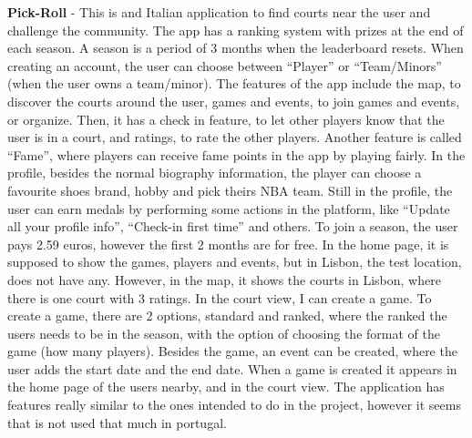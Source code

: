 \textbf{Pick-Roll}\cite{pick-roll} - This is and Italian application to find courts near the user and challenge the community.
The app has a ranking system with prizes at the end of each season.
A season is a period of 3 months when the leaderboard resets.
When creating an account, the user can choose between ``Player'' or ``Team/Minors'' (when the user owns a team/minor).
The features of the app include the map, to discover the courts around the user, games and events, to join games and events, or organize.
Then, it has a check in feature, to let other players know that the user is in a court, and ratings, to rate the other players.
Another feature is called ``Fame'', where players can receive fame points in the app by playing fairly.
In the profile, besides the normal biography information, the player can choose a favourite shoes brand, hobby and pick theirs NBA team.
Still in the profile, the user can earn medals by performing some actions in the platform, like ``Update all your profile info'', ``Check-in first time'' and others.
To join a season, the user pays 2.59 euros, however the first 2 months are for free.
In the home page, it is supposed to show the games, players and events, but in Lisbon, the test location, does not have any.
However, in the map, it shows the courts in Lisbon, where there is one court with 3 ratings.
In the court view, I can create a game.
To create a game, there are 2 options, standard and ranked, where the ranked the users needs to be in the season, with the option of choosing the format of the game (how many players).
Besides the game, an event can be created, where the user adds the start date and the end date.
When a game is created it appears in the home page of the users nearby, and in the court view.
The application has features really similar to the ones intended to do in the project, however it seems that is not used that much in portugal.





































































